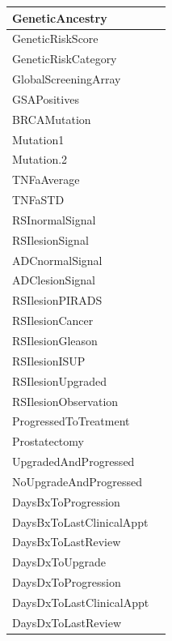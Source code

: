 \documentclass[]{article}
\begin{document}
\begin{longtable}{| p{} | p{} |}
  \hline
  GeneticAncestry           &   \\
  \hline
  GeneticRiskScore          &   \\
  \hline
  GeneticRiskCategory       &   \\
  \hline
  GlobalScreeningArray      &   \\
  \hline
  GSAPositives              &   \\
  \hline
  BRCAMutation              &   \\
  \hline
  Mutation1                 &   \\   
  \hline
  Mutation.2                &   \\ 
  \hline
  TNFaAverage               &   \\   
  \hline
  TNFaSTD                   &   \\ 
  \hline
  RSInormalSignal           &   \\   
  \hline
  RSIlesionSignal           &   \\ 
  \hline
  ADCnormalSignal           &   \\   
  \hline
  ADClesionSignal           &   \\ 
  \hline
  RSIlesionPIRADS           &   \\   
  \hline
  RSIlesionCancer           &   \\ 
  \hline
  RSIlesionGleason          &   \\   
  \hline
  RSIlesionISUP             &   \\ 
  \hline
  RSIlesionUpgraded         &   \\   
  \hline
  RSIlesionObservation      &   \\ 
  \hline
  ProgressedToTreatment     &   \\   
  \hline
  Prostatectomy             &   \\ 
  \hline
  UpgradedAndProgressed     &   \\   
  \hline
  NoUpgradeAndProgressed    &   \\ 
  \hline
  DaysBxToProgression       &   \\   
  \hline
  DaysBxToLastClinicalAppt  &   \\ 
  \hline
  DaysBxToLastReview        &   \\   
  \hline
  DaysDxToUpgrade           &   \\ 
  \hline
  DaysDxToProgression       &   \\   
  \hline
  DaysDxToLastClinicalAppt  &   \\ 
  \hline
  DaysDxToLastReview        &   \\ 
  \hline




\end{longtable}
\end{document}
